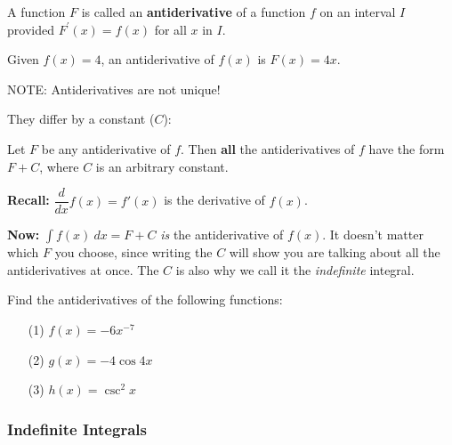 \documentclass[cal1spr16Lectures.tex]{subfiles}
\begin{document}
\begin{frame}\small
\begin{dfn} A function $F$ is called an {\bf antiderivative} of a function $f$ on an interval $I$ provided $F^{\prime}(x)=f(x)$ for all $x$ in $I$. \end{dfn}

\vspace{1pc}
\begin{ex} Given $f(x)=4$, an antiderivative of $f(x)$ is $F(x)=4x$.  \end{ex}

NOTE: Antiderivatives are not unique!
\end{frame}

\begin{frame}\footnotesize
They differ by a constant ($C$):

\begin{thm}
Let $F$ be any antiderivative of $f$.  Then {\bf all} the antiderivatives of $f$ have the form $F+C$, where $C$ is an arbitrary constant.
\end{thm}

\vspace{1pc}
{\bf Recall:} $\dfrac{d}{dx} f(x)=f'(x)$ is the derivative of $f(x)$. 

\vspace{1pc}
{\bf Now:} $\int f(x)\ dx=F+C$ \alert{\it is} the antiderivative of $f(x)$.  It doesn't matter which $F$ you choose, since writing the $C$ will show you are talking about all the antiderivatives at once.  The $C$ is also why we call it the {\it indefinite} integral.
\end{frame}

\begin{frame}
\begin{ex}
Find the antiderivatives of the following functions:
\begin{itemize}
\item[(1) ]$f(x)=-6x^{-7}$
\item[(2) ]$g(x)=-4\cos{4x}$
\item[(3) ]$h(x)=\csc^2{x}$
\end{itemize}
\end{ex}
\end{frame}

\subsubsection{Indefinite Integrals}
\end{document}
